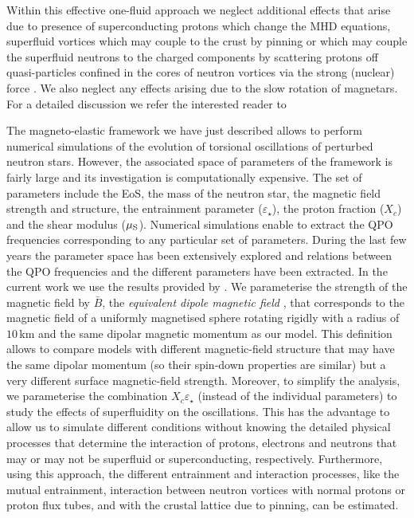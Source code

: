 \documentclass[useAMS,usenatbib]{mnras}
\begin{document}
Within this effective one-fluid approach we neglect additional effects that arise due to presence of superconducting protons which change the MHD equations, superfluid vortices which may couple to the crust by pinning or which may couple the superfluid neutrons to the charged components by scattering protons off quasi-particles confined in the cores of neutron 
vortices via the strong (nuclear) force \citep{Sedrakian2016}. We also neglect any effects arising due to the slow rotation of magnetars. For a detailed discussion we refer the interested reader to \cite{Gabler2016}

The magneto-elastic framework we have just described allows to perform numerical simulations of the evolution of torsional 
oscillations of perturbed neutron stars. However, the associated space of parameters of the framework is fairly large and its investigation is computationally expensive. The set of parameters include the EoS, the mass of the neutron star, the magnetic field strength and structure, the entrainment parameter ($\varepsilon_\star$), the proton fraction ($X_c$) and the shear modulus ($\mu_{\rm S}$). Numerical simulations enable to extract the QPO frequencies corresponding to any particular set of parameters. During the last few years the parameter space has been extensively explored and relations between the QPO frequencies and the different parameters have been extracted. In the current work we use the results  provided by \cite{Sotani2008,Cerda2009,Gabler2011letter,Gabler2012, Gabler2013a, Gabler2013b, Gabler2016}. We parameterise the strength of the magnetic field by $\bar B$, the {\it equivalent dipole magnetic field} \citep[see][]{Gabler2013a}, that corresponds to the magnetic field of a uniformly magnetised sphere rotating rigidly with a radius of $10\,$km and the same dipolar magnetic momentum as our model. This definition allows to compare models with different magnetic-field structure that may have the same dipolar momentum (so their spin-down properties are similar) but a very different surface magnetic-field strength. Moreover, to simplify the analysis, we parameterise the combination $X_c\varepsilon_\star$ (instead of the individual parameters) to study the effects of superfluidity on the oscillations. This has the advantage to allow us to simulate different conditions without knowing the detailed physical processes that determine the interaction of protons, electrons and neutrons that may or may not be superfluid or superconducting, respectively. Furthermore, using this approach, the different entrainment and interaction processes, like the mutual entrainment, interaction between neutron vortices with normal protons or proton flux tubes, and with the crustal lattice due to pinning, can be estimated. 
\end{document}
